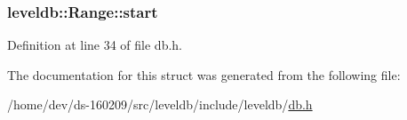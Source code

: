 \subsubsection[{start}]{ leveldb\+::\+Range\+::start}\label{structleveldb_1_1_range_ad80a55e20eb7d864d497e8f94953c00d}


Definition at line 34 of file db.\+h.



The documentation for this struct was generated from the following file\+:\begin{DoxyCompactItemize}
\item 
/home/dev/ds-\/160209/src/leveldb/include/leveldb/\hyperlink{leveldb_2include_2leveldb_2db_8h}{db.\+h}\end{DoxyCompactItemize}
